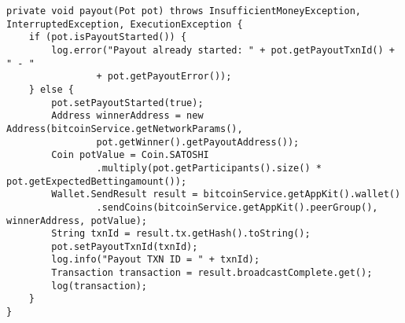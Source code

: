 \begin{lstlisting}
private void payout(Pot pot) throws InsufficientMoneyException, InterruptedException, ExecutionException {
    if (pot.isPayoutStarted()) {
        log.error("Payout already started: " + pot.getPayoutTxnId() + " - "
                + pot.getPayoutError());
    } else {
        pot.setPayoutStarted(true);
        Address winnerAddress = new Address(bitcoinService.getNetworkParams(),
                pot.getWinner().getPayoutAddress());
        Coin potValue = Coin.SATOSHI
                .multiply(pot.getParticipants().size() * pot.getExpectedBettingamount());
        Wallet.SendResult result = bitcoinService.getAppKit().wallet()
                .sendCoins(bitcoinService.getAppKit().peerGroup(), winnerAddress, potValue);
        String txnId = result.tx.getHash().toString();
        pot.setPayoutTxnId(txnId);
        log.info("Payout TXN ID = " + txnId);
        Transaction transaction = result.broadcastComplete.get();
        log(transaction);
    }
}
\end{lstlisting}


